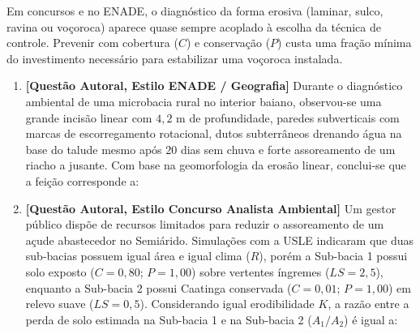 
\begin{boxDica}
Em concursos e no ENADE, o diagnóstico da forma erosiva (laminar, sulco, ravina ou voçoroca) aparece quase sempre acoplado à escolha da técnica de controle. Prevenir com cobertura ($C$) e conservação ($P$) custa uma fração mínima do investimento necessário para estabilizar uma voçoroca instalada.
\end{boxDica}

\begin{enumerate}[leftmargin=1.8em, itemsep=7pt]
  \item \textbf{[Questão Autoral, Estilo ENADE / Geografia]} Durante o diagnóstico ambiental de uma microbacia rural no interior baiano, observou-se uma grande incisão linear com $4{,}2\text{ m}$ de profundidade, paredes subverticais com marcas de escorregamento rotacional, dutos subterrâneos drenando água na base do talude mesmo após $20$ dias sem chuva e forte assoreamento de um riacho a jusante. Com base na geomorfologia da erosão linear, conclui-se que a feição corresponde a:

  \item \textbf{[Questão Autoral, Estilo Concurso Analista Ambiental]} Um gestor público dispõe de recursos limitados para reduzir o assoreamento de um açude abastecedor no Semiárido. Simulações com a USLE indicaram que duas sub-bacias possuem igual área e igual clima ($R$), porém a Sub-bacia 1 possui solo exposto ($C = 0{,}80$; $P = 1{,}00$) sobre vertentes íngremes ($LS = 2{,}5$), enquanto a Sub-bacia 2 possui Caatinga conservada ($C = 0{,}01$; $P = 1{,}00$) em relevo suave ($LS = 0{,}5$). Considerando igual erodibilidade $K$, a razão entre a perda de solo estimada na Sub-bacia 1 e na Sub-bacia 2 ($A_1 / A_2$) é igual a:


\end{enumerate}

